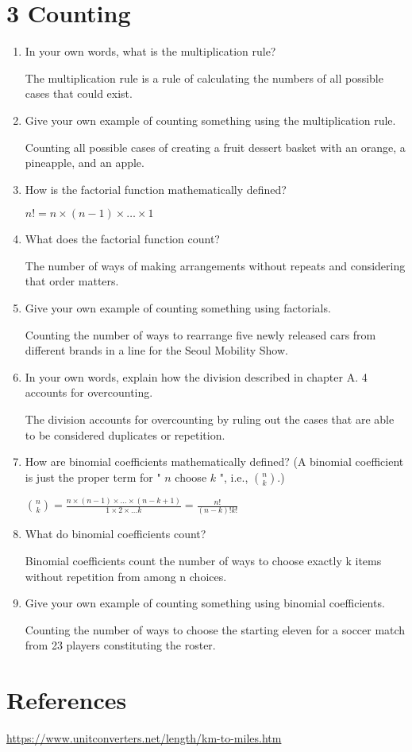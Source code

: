 \documentclass[10pt]{article}
\begin{document}
\section*{3 \quad Counting}

\begin{enumerate}
  \item In your own words, what is the multiplication rule?

        The multiplication rule is a rule of calculating the numbers of all possible cases that could exist.
  \item Give your own example of counting something using the multiplication rule.

        Counting all possible cases of creating a fruit dessert basket with an orange, a pineapple, and an apple.
  \item How is the factorial function mathematically defined?

        $n! = n \times (n-1) \times \ldots \times 1$
  \item What does the factorial function count?

        The number of ways of making arrangements without repeats and considering that order matters.
  \item Give your own example of counting something using factorials.

        Counting the number of ways to rearrange five newly released cars from different brands in a line for the Seoul Mobility Show.
  \item In your own words, explain how the division described in chapter A. 4 accounts for overcounting.

        The division accounts for overcounting by ruling out the cases that are able to be considered duplicates or repetition.
  \item How are binomial coefficients mathematically defined? (A binomial coefficient is just the proper term for " $n$ choose $k$ ", i.e., $\binom{n}{k}$.)

        $\binom{n}{k}=\frac{n \times(n-1) \times \ldots \times(n-k+1)}{1 \times 2 \times \ldots k}=\frac{n!}{(n-k)!k!}$
  \item What do binomial coefficients count?

        Binomial coefficients count the number of ways to choose exactly k items without repetition from among n choices.
  \item Give your own example of counting something using binomial coefficients.

        Counting the number of ways to choose the starting eleven for a soccer match from 23 players constituting the roster.
\end{enumerate}

\section*{References}
\url{https://www.unitconverters.net/length/km-to-miles.htm}
\end{document}
